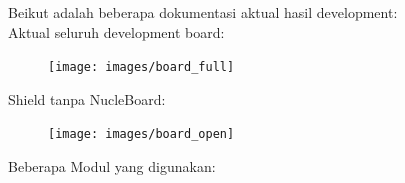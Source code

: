 \documentclass[12pt,]{article}
\begin{document}
	Beikut adalah beberapa dokumentasi aktual hasil development:\\
	
	Aktual seluruh development board:
	\begin{figure}[!ht]
		\centering
		\texttt{[image: images/board\_full]}
	\end{figure}

	\newpage
	Shield tanpa NucleBoard:
	\begin{figure}[!ht]
		\centering
		\texttt{[image: images/board\_open]}
	\end{figure}

	\newpage
	Beberapa Modul yang digunakan:
	
	\begin{figure}[!ht]
		\footnotesize
		\hspace{1cm}%
	\end{figure}
\end{document}
